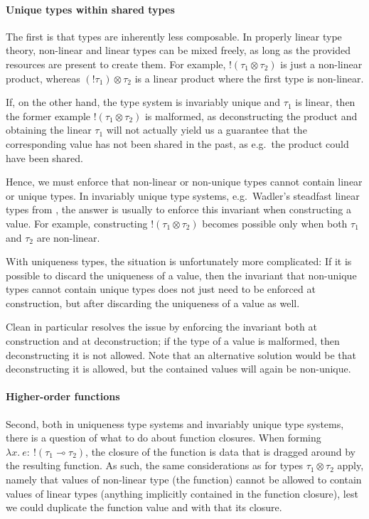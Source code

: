 \paragraph{Unique types within shared types} The first is that types are inherently less composable. In properly linear type theory, non-linear and linear types can be mixed freely, as long as the provided resources are present to create them. For example, $!(\tau_1 \otimes \tau_2)$ is just a non-linear product, whereas $(!\tau_1) \otimes \tau_2$ is a linear product where the first type is non-linear. 

If, on the other hand, the type system is invariably unique and $\tau_1$ is linear, then the former example $!(\tau_1 \otimes \tau_2)$ is malformed, as deconstructing the product and obtaining the linear $\tau_1$ will not actually yield us a guarantee that the corresponding value has not been shared in the past, as e.g.\ the product could have been shared. 

Hence, we must enforce that non-linear or non-unique types cannot contain linear or unique types. In invariably unique type systems, e.g.\ Wadler's steadfast linear types from \cite{wadler_is_1991}, the answer is usually to enforce this invariant when constructing a value. For example, constructing $!(\tau_1 \otimes \tau_2)$ becomes possible only when both $\tau_1$ and $\tau_2$ are non-linear.

With uniqueness types, the situation is unfortunately more complicated: If it is possible to discard the uniqueness of a value, then the invariant that non-unique types cannot contain unique types does not just need to be enforced at construction, but after discarding the uniqueness of a value as well. 

Clean in particular resolves the issue by enforcing the invariant both at construction and at deconstruction; if the type of a value is malformed, then deconstructing it is not allowed. Note that an alternative solution would be that deconstructing it is allowed, but the contained values will again be non-unique.

\paragraph{Higher-order functions} Second, both in uniqueness type systems and invariably unique type systems, there is a question of what to do about function closures. When forming $\lambda x.\ e :\ !(\tau_1 \multimap \tau_2)$, the closure of the function is data that is dragged around by the resulting function. As such, the same considerations as for types $\tau_1 \otimes \tau_2$ apply, namely that values of non-linear type (the function) cannot be allowed to contain values of linear types (anything implicitly contained in the function closure), lest we could duplicate the function value and with that its closure. 

